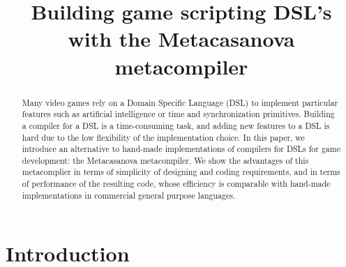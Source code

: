 \documentclass[lnicst]{svmultln}
\begin{document}
%
\mainmatter              %
%
\title{Building game scripting DSL's with the Metacasanova metacompiler}
%
%
%
%
%

\maketitle              %

\begin{abstract}
	Many video games rely on a Domain Specific Language (DSL) to implement
	particular features such as artificial intelligence or time and
	synchronization primitives.
	Building a compiler for a DSL is a time-consuming task, and adding new
	features to a DSL is hard  due to the low flexibility of the
	implementation choice.
	In this paper, we introduce an alternative to hand-made
	implementations of compilers for DSLs  for game development: the
	Metacasanova metacompiler.
	We show the advantages of this metacomplier  in terms of simplicity of
	designing and coding requirements, and in terms of  performance of the
	resulting code, whose efficiency is comparable with hand-made
	implementations in commercial general purpose languages.
\end{abstract}

\section{Introduction}
\label{sec:introduction}

\end{document}
